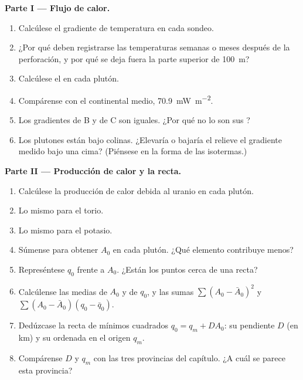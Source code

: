 \begin{problem}
\medskip
\noindent\textbf{Parte I --- Flujo de calor.}
\begin{enumerate}
  \item Calcúlese el gradiente de temperatura en cada sondeo.
  \item ¿Por qué deben registrarse las temperaturas semanas o meses después de la perforación, y por qué se deja fuera
        la parte superior de \qty{100}{m}?
  \item Calcúlese el  en cada plutón.
  \item Compárense con el  continental medio, \qty{70.9}{mW.m^{-2}}.
  \item Los gradientes de B y de C son iguales. ¿Por qué no lo son sus ?
  \item Los plutones están bajo colinas. ¿Elevaría o bajaría el relieve el gradiente medido bajo una cima?
        (Piénsese en la forma de las isotermas.)
\end{enumerate}

\noindent\textbf{Parte II --- Producción de calor y la recta.}
\begin{enumerate}[resume]
  \item Calcúlese la producción de calor debida al uranio en cada plutón.
  \item Lo mismo para el torio.
  \item Lo mismo para el potasio.
  \item Súmense para obtener $A_0$ en cada plutón. ¿Qué elemento contribuye
        menos?
  \item Represéntese $q_0$ frente a $A_0$. ¿Están los puntos cerca de una recta?
  \item Calcúlense las medias de $A_0$ y de $q_0$, y las sumas
        $\sum (A_0 - \bar A_0)^2$ y $\sum (A_0 - \bar A_0)(q_0 - \bar q_0)$.
  \item Dedúzcase la recta de mínimos cuadrados $q_0 = q_m + D A_0$: su pendiente $D$ (en
        \unit{km}) y su ordenada en el origen $q_m$.
  \item Compárense $D$ y $q_m$ con las tres provincias del capítulo. ¿A cuál
        se parece esta provincia?
\end{enumerate}


\end{problem}
